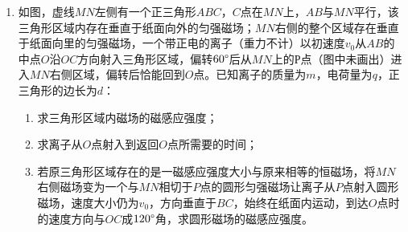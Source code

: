 \begin{enumerate}



\newpage
\item 
如图，虚线$ MN $左侧有一个正三角形$ ABC $，$ C $点在$ MN $上，$ AB $与$ MN $平行，该三角形区域内存在垂直于纸面向外的匀强磁场；$ MN $右侧的整个区域存在垂直于纸面向里的匀强磁场，一个带正电的离子（重力不计）以初速度$ v_{0} $从$ AB $的中点$ O $沿$ OC $方向射入三角形区域，偏转$ 60 \degree $后从$ MN $上的Р点（图中未画出）进入$ MN $右侧区域，偏转后恰能回到$ O $点。已知离子的质量为$ m $，电荷量为$ q $，正三角形的边长为$ d $：
\begin{enumerate}
\item
求三角形区域内磁场的磁感应强度；
\item 
求离子从$ O $点射入到返回$ O $点所需要的时间； 
\item 
若原三角形区域存在的是一磁感应强度大小与原来相等的恒磁场，将$ MN $右侧磁场变为一个与$ MN $相切于$ P $点的圆形匀强磁场让离子从$ P $点射入圆形磁场，速度大小仍为$ v_{0} $，方向垂直于$ BC $，始终在纸面内运动，到达$ O $点时的速度方向与$ OC $成$ 120 \degree $角，求圆形磁场的磁感应强度。


\end{enumerate}
\begin{figure}[h!]
\flushright

\end{figure}














\end{enumerate}

